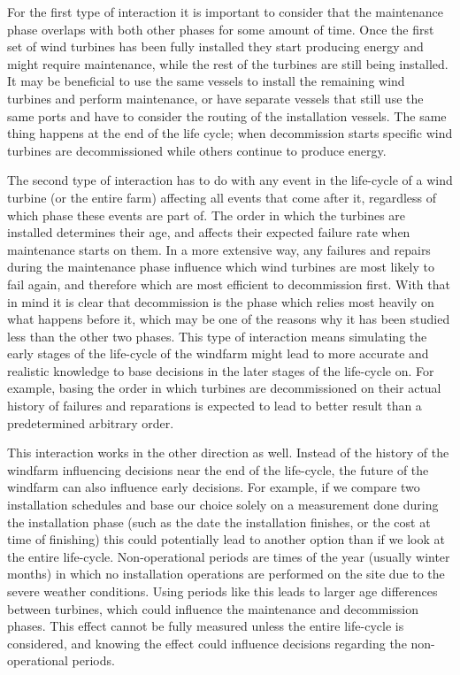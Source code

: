 \documentclass[a4paper,12pt]{article}
\begin{document}
For the first type of interaction it is important to consider that the maintenance phase overlaps with both other phases for some amount of time. Once the first set of wind turbines has been fully installed they start producing energy and might require maintenance, while the rest of the turbines are still being installed. It may be beneficial to use the same vessels to install the remaining wind turbines and perform maintenance, or have separate vessels that still use the same ports and have to consider the routing of the installation vessels. The same thing happens at the end of the life cycle; when decommission starts specific wind turbines are decommissioned while others continue to produce energy. 

The second type of interaction has to do with any event in the life-cycle of a wind turbine (or the entire farm) affecting all events that come after it, regardless of which phase these events are part of. The order in which the turbines are installed determines their age, and affects their expected failure rate when maintenance starts on them. In a more extensive way, any failures and repairs during the maintenance phase influence which wind turbines are most likely to fail again, and therefore which are most efficient to decommission first. With that in mind it is clear that decommission is the phase which relies most heavily on what happens before it, which may be one of the reasons why it has been studied less than the other two phases. This type of interaction means simulating the early stages of the life-cycle of the windfarm might lead to more accurate and realistic knowledge to base decisions in the later stages of the life-cycle on. For example, basing the order in which turbines are decommissioned on their actual history of failures and reparations is expected to lead to better result than a predetermined arbitrary order. 

This interaction works in the other direction as well. Instead of the history of the windfarm influencing decisions near the end of the life-cycle, the future of the windfarm can also influence early decisions. For example, if we compare two installation schedules and base our choice solely on a measurement done during the installation phase (such as the date the installation finishes, or the cost at time of finishing) this could potentially lead to another option than if we look at the entire life-cycle. Non-operational periods are times of the year (usually winter months) in which no installation operations are performed on the site due to the severe weather conditions. Using periods like this leads to larger age differences between turbines, which could influence the maintenance and decommission phases. This effect cannot be fully measured unless the entire life-cycle is considered, and knowing the effect could influence decisions regarding the non-operational periods. 
\end{document}
